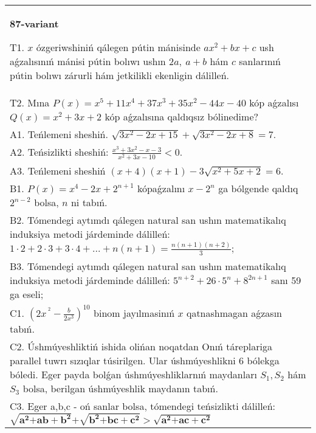 \documentclass{article}
\begin{document}
\begin{tabular}{m{17cm}}
\textbf{87-variant}
\newline

T1. \(x\) ózgeriwshiniń qálegen pútin mánisinde \(ax^{2} + bx + c\) ush aǵzalısınıń mánisi pútin bolıwı ushın \(2a,\ a + b\) hám \(c\) sanlarınıń pútin bolıwı zárurli hám jetkilikli ekenligin dálilleń. \\
T2. Mına \(P(x) = x^{5} + 11x^{4} + 37x^{3} + 35x^{2} - 44x - 40\) kóp aǵzalısı \(Q(x) = x^{2} + 3x + 2\) kóp aǵzalısına qaldıqsız bólinedime? \\
A1. Teńlemeni sheshiń. \(\sqrt{3x^{2} - 2x + 15} + \sqrt{3x^{2} - 2x + 8} = 7\). \\
A2. Teńsizlikti sheshiń: \(\frac{x^{3} + 3x^{2} - x - 3}{x^{2} + 3x - 10} < 0\). \\
A3. Teńlemeni sheshiń \((x + 4)(x + 1) - 3\sqrt{x^{2} + 5x + 2} = 6\). \\
B1. \(P(x) = x^{4} - 2x + 2^{n + 1}\) kópaǵzalını \(x - 2^{n}\) ga bólgende qaldıq \(2^{n - 2}\) bolsa, \(n\) ni tabıń. \\
B2. Tómendegi aytımdı qálegen natural san ushın matematikalıq induksiya metodi járdeminde dálilleń: \(1 \cdot 2 + 2 \cdot 3 + 3 \cdot 4 + ... + n(n + 1) = \frac{n(n + 1)(n + 2)}{3}\); \\
B3. Tómendegi aytımdı qálegen natural san ushın matematikalıq induksiya metodi járdeminde dálilleń: \(5^{n + 2} + 26 \cdot 5^{n} + 8^{2n + 1}\) sanı 59 ga eseli; \\
C1. \(\left( 2x^{\ ^{2}} - \frac{b}{2x^{3}} \right)^{10}\) binom jayılmasinıń \(x\) qatnashmagan aǵzasın tabıń. \\
C2. Úshmúyeshliktiń ishida olińan noqatdan Onıń táreplariga parallel tuwrı sızıqlar túsirilgen. Ular úshmúyeshlikni 6 bólekga bóledi. Eger payda bolǵan úshmúyeshliklarnıń maydanları \(S_{1},S_{2}\) hám \(S_{3}\) bolsa, berilgan úshmúyeshlik maydanın tabıń. \\
C3. Eger a,b,c - oń sanlar bolsa, tómendegi teńsizlikti dálilleń: \(\sqrt{\mathbf{a}^{\mathbf{2}}\mathbf{+ ab +}\mathbf{b}^{\mathbf{2}}}\mathbf{+}\sqrt{\mathbf{b}^{\mathbf{2}}\mathbf{+ bc +}\mathbf{c}^{\mathbf{2}}}\mathbf{>}\sqrt{\mathbf{a}^{\mathbf{2}}\mathbf{+ ac +}\mathbf{c}^{\mathbf{2}}}\) \\

\end{tabular}
\vspace{1cm}
\end{document}
